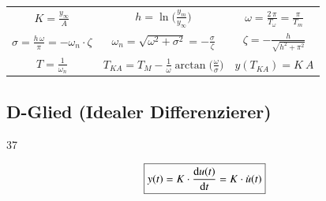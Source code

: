 \begin{tabular}{c c c}
    $ K = \frac{y_{\infty}}{A}$                                                     & $ h = \ln \big( \frac{y_m}{y_{\infty}} \big)$                                 & $ \omega = \frac{2 \, \pi}{T_{\omega}} = \frac{\pi}{T_m} $ \\

    \rule{0pt}{10pt}$ \sigma = \frac{h \, \omega}{\pi} = - \omega_n \cdot \zeta$    & $ \omega_n = \sqrt{\omega^2 + \sigma^2} = - \frac{\sigma}{\zeta}$             & $ \zeta = - \frac{h}{\sqrt{h^2 + \pi^2}} $ \\

    \rule{0pt}{10pt}$T = \frac{1}{\omega_n}$                                        & $T_{KA} = T_M - \frac{1}{\omega} \arctan \big(  \frac{\omega}{\sigma} \big)$  & $y(T_{KA}) = K \: A$ \\
\end{tabular}


\subsection{D-Glied (Idealer Differenzierer)}{37}

$$ \boxed{  y(t) = K \cdot \frac{\mathop{} \! \mathrm{d} u(t)}{\mathop{} \! \mathrm{d} t} = K  \cdot \dot{u}(t) } $$

